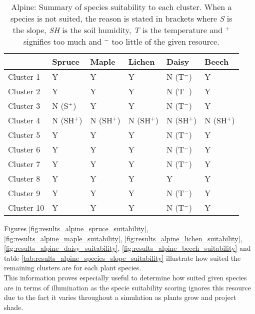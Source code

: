 
\begin{table}[h]
  \centering
	    \begin{tabular}{|p{2cm}|p{2.5cm}|p{2.5cm}|p{2.5cm}|p{2.5cm}|p{2.5cm}|}
		\hline	
		&  \textbf{Spruce} & \textbf{Maple} & \textbf{Lichen} & \textbf{Daisy} & \textbf{Beech}\\
		\hline	
		Cluster 1 & 
		Y & 
		Y & 
		Y & 
		\cellcolor{color_red}N (T$^{-}$) & 
		Y \\
		\hline	
		Cluster 2 & 
		Y & 
		Y & 
		Y & 
		\cellcolor{color_red}N (T$^{-}$) & 
		Y \\
		\hline	
		Cluster 3 & 
		\cellcolor{color_red}N (S$^{+}$) & 
		Y & 
		Y & 
		\cellcolor{color_red}N (T$^{-}$) & 
		Y \\
		\hline	
		Cluster 4 & 
		\cellcolor{color_red}N (SH$^{+}$) & 
		\cellcolor{color_red}N (SH$^{+}$) & 
		\cellcolor{color_red}N (SH$^{+}$) & 
		\cellcolor{color_red}N (SH$^{+}$) & 
		\cellcolor{color_red}N (SH$^{+}$) \\
		\hline	
		Cluster 5 & 
		Y & 
		Y & 
		Y & 
		\cellcolor{color_red}N (T$^{-}$) & 
		Y \\
		\hline	
		Cluster 6 & 
		Y & 
		Y & 
		Y & 
		\cellcolor{color_red}N (T$^{-}$) & 
		Y \\
		\hline	
		Cluster 7 & 
		Y & 
		Y & 
		Y & 
		\cellcolor{color_red}N (T$^{-}$) & 
		Y \\
		\hline	
		Cluster 8 & 
		Y & 
		Y & 
		Y & 
		Y &
		Y \\
		\hline	
		Cluster 9 & 
		Y & 
		Y & 
		Y & 
		\cellcolor{color_red}N (T$^{-}$) & 
		Y \\
		\hline	
		Cluster 10 &
		Y & 
		Y & 
		Y & 
		\cellcolor{color_red}N (T$^{-}$) & 
		Y \\
		\hline	
		\end{tabular}
		\caption{Alpine: Summary of species suitability to each cluster. When a species is not suited, the reason is stated in brackets where \textit{S} is the slope, \textit{SH} is the soil humidity, \textit{T} is the temperature and $^{+}$ signifies too much and $^{-}$ too little of the given resource.}
	  \label{tab:results_alpine_species_suitability}
\end{table}

Figures \ref{fig:results_alpine_spruce_suitability}, \ref{fig:results_alpine_maple_suitability}, \ref{fig:results_alpine_lichen_suitability}, \ref{fig:results_alpine_daisy_suitability}, \ref{fig:results_alpine_beech_suitability} and table \ref{tab:results_alpine_species_slope_suitability} illustrate how suited the remaining clusters are for each plant species.\\
This information proves especially useful to determine how suited given species are in terms of illumination as the specie suitability scoring ignores this resource due to the fact it varies throughout a simulation as plants grow and project shade.\\

